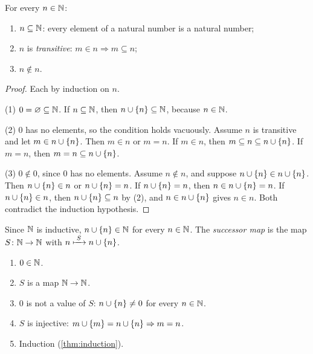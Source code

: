 \begin{lemma}
\label{lem:shape}
For every $n \in \mathbb{N}$:
\begin{enumerate}
  \item $n \subseteq \mathbb{N}$: every element of a natural number is a natural number;
  \item $n$ is \emph{transitive}: $m \in n \Rightarrow m \subseteq n$;
  \item $n \notin n$.
\end{enumerate}
\end{lemma}

\begin{proof}
Each by induction on $n$.

(1) $0 = \varnothing \subseteq \mathbb{N}$. If $n \subseteq \mathbb{N}$, then $n \cup \lbrace n \rbrace \subseteq \mathbb{N}$,
because $n \in \mathbb{N}$.

(2) $0$ has no elements, so the condition holds vacuously. Assume $n$ is
transitive and let $m \in n \cup \lbrace n \rbrace$. Then $m \in n$ or $m = n$. If $m \in n$, then $m
\subseteq n \subseteq n \cup \lbrace n \rbrace$. If $m = n$, then $m = n \subseteq n \cup \lbrace n \rbrace$.

(3) $0 \notin 0$, since $0$ has no elements. Assume $n \notin n$, and suppose $n \cup \lbrace n \rbrace
\in n \cup \lbrace n \rbrace$. Then $n \cup \lbrace n \rbrace \in n$ or $n \cup \lbrace n \rbrace = n$. If $n \cup \lbrace n \rbrace = n$, then $n \in n \cup \lbrace n \rbrace = n$. If
$n \cup \lbrace n \rbrace \in n$, then $n \cup \lbrace n \rbrace \subseteq n$ by (2), and $n \in n \cup \lbrace n \rbrace$ gives $n \in n$. Both
contradict the induction hypothesis.
\end{proof}

\begin{definition}
\label{def:successor-map}
Since $\mathbb{N}$ is inductive, $n \cup \lbrace n \rbrace \in \mathbb{N}$ for every $n \in \mathbb{N}$. The
\emph{successor map} is the map $S \colon \mathbb{N} \to \mathbb{N}$ with $n \xmapsto{\;S\;} n \cup
\lbrace n \rbrace$.
\end{definition}

\begin{theorem}
\label{thm:peano}
\leavevmode
\begin{enumerate}
  \item $0 \in \mathbb{N}$.
  \item $S$ is a map $\mathbb{N} \to \mathbb{N}$.
  \item $0$ is not a value of $S$: $n \cup \lbrace n \rbrace \neq 0$ for every $n \in \mathbb{N}$.
  \item $S$ is injective: $m \cup \lbrace m \rbrace = n \cup \lbrace n \rbrace \Rightarrow m = n$.
  \item Induction (\cref{thm:induction}).
\end{enumerate}
\end{theorem}

